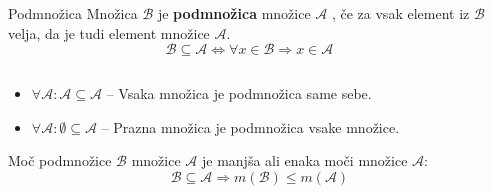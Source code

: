         \begin{frame}
            \begin{columns}
                    \begin{alertblock}{Podmnožica}
                        Množica $\mathcal{B}$ je \textbf{podmnožica} množice $\mathcal{A}$ , če za vsak element iz
                        $\mathcal{B}$ velja, da je tudi element množice $\mathcal{A}$.
                        $$ \mathcal{B}\subseteq\mathcal{A}\Leftrightarrow\forall x\in\mathcal{B}\Rightarrow x\in\mathcal{A} $$
                    \end{alertblock}


                    \begin{block}{}
                    \end{block}

            \end{columns}  

            \begin{block}{}
                \begin{itemize}
                    \item $\forall \mathcal{A}:\mathcal{A}\subseteq\mathcal{A}$ -- Vsaka množica je podmnožica
                        same sebe.
                    \item $\forall \mathcal{A}:\emptyset\subseteq\mathcal{A}$ -- Prazna množica je podmnožica
                        vsake množice.
                \end{itemize}
            \end{block}

            \begin{block}{}
                Moč podmnožice $\mathcal{B}$ množice $\mathcal{A}$ je manjša ali enaka moči množice $\mathcal{A}$:
                $$\mathcal{B}\subseteq\mathcal{A}\Rightarrow m(\mathcal{B})\leq m(\mathcal{A})$$
            \end{block}

        \end{frame}

